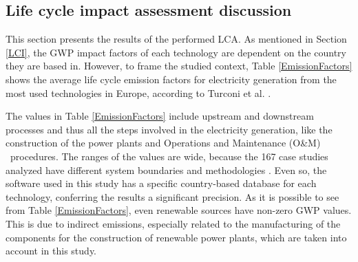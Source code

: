 {\subsection{Life cycle impact assessment discussion}
\label{LCIA_discussion}

This section presents the results of the performed LCA. As mentioned in Section \ref{LCI}, the GWP impact factors of each technology are dependent on the country they are based in. However, to frame the studied context, Table \ref{EmissionFactors} shows the average life cycle emission factors for electricity generation from the most used technologies in Europe, according to Turconi et al. \cite{Turconi2013LifeLimitations}.

The values in  Table \ref{EmissionFactors} include upstream and downstream processes and thus all the steps involved in the electricity generation, like the construction of the power plants and Operations and Maintenance (O\&M)%
~procedures. The ranges of the values are wide, because the 167 case studies analyzed have different system boundaries and methodologies \cite{Turconi2013LifeLimitations}. Even so, the software used in this study has a specific country-based database for each technology, conferring the results a significant precision. {As it is possible to see from Table \ref{EmissionFactors}, even renewable sources have non-zero GWP values. This is due to indirect emissions, especially related to the manufacturing of the components for the construction of renewable power plants, which are taken into account in this study.}  

}
